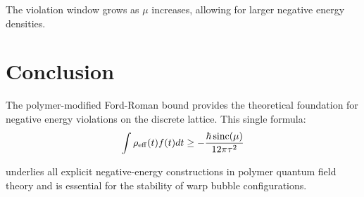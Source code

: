 \documentclass[11pt]{article}
\begin{document}
The violation window grows as $\mu$ increases, allowing for larger negative energy densities.

\section{Conclusion}

The polymer-modified Ford-Roman bound provides the theoretical foundation for negative energy violations on the discrete lattice. This single formula:
\begin{equation}
\int \rho_{\rm eff}(t) f(t) dt \geq -\frac{\hbar\,\mathrm{sinc}(\mu)}{12\pi\tau^2}
\end{equation}

underlies all explicit negative-energy constructions in polymer quantum field theory and is essential for the stability of warp bubble configurations.
\end{document}
